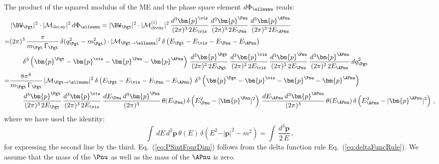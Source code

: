 The product of the squared modulus of the ME and the phase space
element $d\Phi_{\ellnunu}$ reads:
\begin{align}
& \, \vert \BW_{\Pgt} \vert^{2} \cdot \vert\mathcal{M}_{\textrm{decay}}\vert^{2} \,
 d\Phi_{\ellnunu} = \vert \BW_{\Pgt} \vert^{2} \cdot \vert \mathcal{M}^{(i)}_{\textrm{decay}}
\vert^{2} \, 
  \frac{d^{3}\bm{p}^{\vis}}{(2\pi)^{3} \, 2 E_{\vis}} \, 
  \frac{d^{3}\bm{p}^{\Pnu}}{(2\pi)^{3} \, 2 E_{\Pnu}} \, 
  \frac{d^{3}\bm{p}^{\APnu}}{(2\pi)^{3} \, 2 E_{\APnu}} \nonumber \\
= & (2\pi)^{3} \, \frac{\pi}{m_{\Pgt} \, \Gamma_{\Pgt}} \,
\delta ( q_{\Pgt}^{2} - m_{\Pgt}^{2} ) \cdot
\vert\mathcal{M}_{\Pgt \to \ellnunu}\vert^{2} \, \delta \left(
  E_{\Pgt} - E_{\vis} - E_{\Pnu} - E_{\APnu} \right) \nonumber \\
& \qquad
\delta^{3} \left( \bm{p}^{\Pgt} - \bm{p}^{\vis} - \bm{p}^{\Pnu} - \bm{p}^{\APnu} \right) \, \frac{d^{3}\bm{p}^{\Pgt}}{(2\pi)^{3} \, 2 E_{\Pgt}} \,
  \frac{d^{3}\bm{p}^{\vis}}{(2\pi)^{3} \, 2 E_{\vis}} \, 
  \frac{d^{3}\bm{p}^{\Pnu}}{(2\pi)^{3} \, 2 E_{\Pnu}} \, 
  \frac{d^{3}\bm{p}^{\APnu}}{(2\pi)^{3} \, 2 E_{\APnu}} \, dq^{2}_{\Pgt} \nonumber \\
= & \frac{8\pi^{4}}{m_{\Pgt} \, \Gamma_{\Pgt}} \, \vert\mathcal{M}_{\Pgt \to
  \ellnunu}\vert^{2} \, \delta \left( E_{\Pgt} - E_{\vis} -
  E_{\Pnu} - E_{\APnu} \right) \, \delta^{3} \left( \bm{p}^{\Pgt} -
  \bm{p}^{\vis} - \bm{p}^{\Pnu} - \bm{p}^{\APnu} \right)  \nonumber \\
& \qquad
  \frac{d^{3}\bm{p}^{\Pgt}}{(2\pi)^{3} \, 2 E_{\Pgt}} \,
  \frac{d^{3}\bm{p}^{\vis}}{(2\pi)^{3} \, 2 E_{\vis}} \,
  \frac{dE_{\Pnu} \, d^{3}\bm{p}^{\Pnu}}{(2\pi)^{3}} \,
  \theta(E_{\Pnu}) \, \delta \left( E_{\Pnu}^{2} - \vert\bm{p}^{\Pnu}\vert^{2} \right) \, 
  \frac{dE_{\APnu} \, d^{3}\bm{p}^{\APnu}}{(2\pi)^{3}} \,
  \theta(E_{\APnu}) \, \delta \left( E_{\APnu}^{2} - \vert\bm{p}^{\APnu}\vert^{2} \right) \, , 
\end{align}
where we have used the identity:
\begin{equation}
\int \, dE \, d^{3}\bm{p} \, \theta(E) \, \delta \left( E^{2} -
  \vert\bm{p}\vert^{2} - m^{2} \right) = \int \, \frac{d^{3}\bm{p}}{2
  \, E} \, ,
\label{eq:PSintFourDim}
\end{equation}
for expressing the second line by the third.
Eq.~(\ref{eq:PSintFourDim}) follows from the delta function rule Eq.~(\ref{eq:deltaFuncRule}).
We assume that the mass of the $\Pnu$ as well as the mass of the $\APnu$ is zero.

